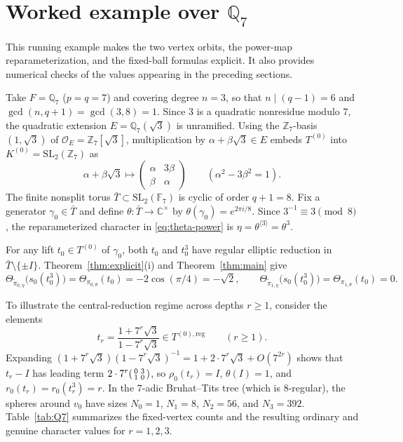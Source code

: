 \documentclass[12pt, letterpaper]{article}
\numberwithin{equation}{section}
\theoremstyle{definition}
\theoremstyle{remark}
\begin{document}
\section{Worked example over \texorpdfstring{$\mathbb{Q}_7$}{Q7}}\label{sec:example}

This running example makes the two vertex orbits, the power-map reparameterization, and the fixed-ball formulas explicit. It also provides numerical checks of the values appearing in the preceding sections.

Take $F=\mathbb{Q}_7$ ($p=q=7$) and covering degree $n=3$, so that $n\mid (q-1)=6$ and $\gcd(n,q+1)=\gcd(3,8)=1$. Since $3$ is a quadratic nonresidue modulo $7$, the quadratic extension $E=\mathbb{Q}_7(\sqrt{3})$ is unramified. Using the $\mathbb{Z}_7$-basis $(1,\sqrt{3})$ of $\mathcal{O}_E=\mathbb{Z}_7[\sqrt{3}]$, multiplication by $\alpha+\beta\sqrt{3}\in E$ embeds $T^{(0)}$ into $K^{(0)}=\mathrm{SL}_2(\mathbb{Z}_7)$ as
\[
 \alpha+\beta\sqrt{3}\longmapsto\begin{pmatrix}\alpha&3\beta\\ \beta&\alpha\end{pmatrix}\qquad (\alpha^2-3\beta^2=1).
\]
The finite nonsplit torus $\bar{T}\subset\mathrm{SL}_2(\mathbb{F}_7)$ is cyclic of order $q+1=8$. Fix a generator $\gamma_0\in\bar{T}$ and define $\theta:\bar{T}\to\mathbb{C}^\times$ by $\theta(\gamma_0)=e^{2\pi i/8}$. Since $3^{-1}\equiv 3\pmod{8}$, the reparameterized character in \eqref{eq:theta-power} is $\eta=\theta^{\langle 3\rangle}=\theta^3$.

For any lift $t_0\in T^{(0)}$ of $\gamma_0$, both $t_0$ and $t_0^3$ have regular elliptic reduction in $\bar{T}\setminus\{\pm I\}$. Theorem~\ref{thm:explicit}(i) and Theorem~\ref{thm:main} give
\[
 \Theta_{\widetilde{\pi}_{0,\eta}}\bigl(s_0(t_0^3)\bigr)=\Theta_{\pi_{0,\theta}}(t_0)=-2\cos(\pi/4)=-\sqrt{2},\qquad
 \Theta_{\widetilde{\pi}_{1,\eta}}\bigl(s_0(t_0^3)\bigr)=\Theta_{\pi_{1,\theta}}(t_0)=0.
\]

To illustrate the central-reduction regime across depths $r\ge 1$, consider the elements
\begin{equation}\label{eq:tr-Q7}
 t_r=\frac{1+7^r\sqrt{3}}{1-7^r\sqrt{3}}\in T^{(0),\mathrm{reg}}\qquad (r\ge 1).
\end{equation}
Expanding $(1+7^r\sqrt{3})(1-7^r\sqrt{3})^{-1}=1+2\cdot 7^r\sqrt{3}+O(7^{2r})$ shows that $t_r-I$ has leading term $2\cdot 7^r\begin{psmallmatrix}0&3\\ 1&0\end{psmallmatrix}$, so $\rho_0(t_r)=I$, $\theta(I)=1$, and $r_0(t_r)=r_0(t_r^3)=r$. In the $7$-adic Bruhat--Tits tree (which is $8$-regular), the spheres around $v_0$ have sizes $N_0=1$, $N_1=8$, $N_2=56$, and $N_3=392$. Table~\ref{tab:Q7} summarizes the fixed-vertex counts and the resulting ordinary and genuine character values for $r=1,2,3$.
\end{document}
